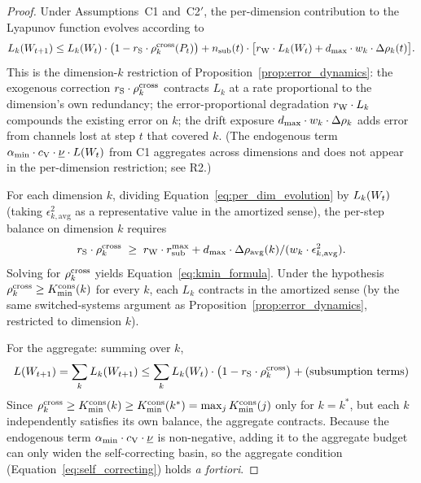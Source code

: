 \begin{proof}
Under Assumptions~C1 and~C2$'$, the per-dimension contribution to the
Lyapunov function evolves according to
\begin{equation}
\label{eq:per_dim_evolution}
L_k(W_{t+1}) \leq L_k(W_t) \cdot \bigl(1 - r_{\mathrm{S}} \cdot
\rho^{\mathrm{cross}}_k(P_t)\bigr) + n_{\mathrm{sub}}(t) \cdot \bigl[r_{\mathrm{W}} \cdot L_k(W_t)
+ d_{\mathrm{max}} \cdot w_k \cdot \Delta\rho_k(t)\bigr].
\end{equation}
This is the dimension-$k$ restriction of Proposition~\ref{prop:error_dynamics}:
the exogenous correction $r_{\mathrm{S}} \cdot \rho^{\mathrm{cross}}_k$ contracts $L_k$ at a
rate proportional to the dimension's own redundancy; the error-proportional
degradation $r_{\mathrm{W}} \cdot L_k$ compounds the existing error on $k$; the
drift exposure $d_{\mathrm{max}} \cdot w_k \cdot \Delta\rho_k$ adds error from
channels lost at step $t$ that covered $k$.  (The endogenous term
$\alpha_{\min} \cdot c_{\mathrm{V}} \cdot \underline{\nu} \cdot L(W_t)$
from C1 aggregates across dimensions and does not appear in the
per-dimension restriction; see R2.)

For each dimension $k$, dividing
Equation~\ref{eq:per_dim_evolution} by $L_k(W_t)$ (taking
$\epsilon_{k,\mathrm{avg}}^2$ as a representative value in the
amortized sense), the per-step balance on dimension $k$ requires
\begin{equation}
\label{eq:per_dim_balance}
r_{\mathrm{S}} \cdot \rho^{\mathrm{cross}}_k \;\geq\; r_{\mathrm{W}} \cdot r_{\mathrm{sub}}^{\max}
  + d_{\mathrm{max}} \cdot \Delta\rho_{\mathrm{avg}}(k) / (w_k \cdot
  \epsilon_{k,\mathrm{avg}}^2).
\end{equation}
Solving for $\rho^{\mathrm{cross}}_k$ yields
Equation~\ref{eq:kmin_formula}.  Under the hypothesis
$\rho^{\mathrm{cross}}_k \geq K_{\mathrm{min}}^{\mathrm{cons}}(k)$ for every $k$, each $L_k$ contracts
in the amortized sense (by the same switched-systems argument as
Proposition~\ref{prop:error_dynamics}, restricted to dimension $k$).

For the aggregate: summing over $k$,
\begin{equation}
L(W_{t+1}) = \sum_k L_k(W_{t+1}) \leq \sum_k L_k(W_t)
  \cdot \bigl(1 - r_{\mathrm{S}} \cdot \rho^{\mathrm{cross}}_k\bigr) + \text{(subsumption terms)}
\end{equation}
Since $\rho^{\mathrm{cross}}_k \geq K_{\mathrm{min}}^{\mathrm{cons}}(k) \geq
K_{\mathrm{min}}^{\mathrm{cons}}(k^*) = \max_j K_{\mathrm{min}}^{\mathrm{cons}}(j)$ only for $k=k^*$, but each
$k$ independently satisfies its own balance, the aggregate contracts.
Because the endogenous term $\alpha_{\min} \cdot c_{\mathrm{V}} \cdot
\underline{\nu}$ is non-negative, adding it to the aggregate budget
can only widen the self-correcting basin, so the aggregate condition
(Equation~\ref{eq:self_correcting}) holds \emph{a fortiori}.


\end{proof}
